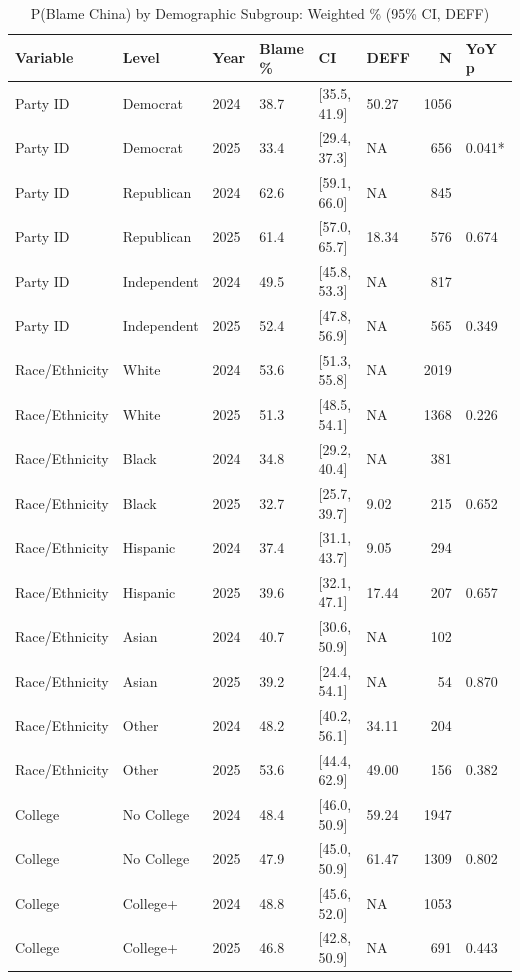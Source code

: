 \begin{table}[!h]
\centering
\caption{P(Blame China) by Demographic Subgroup: Weighted \% (95\% CI, DEFF)}
\centering
\begin{tabular}[t]{llllllrl}
\toprule
Variable & Level & Year & Blame \% & CI & DEFF & N & YoY p\\
\midrule
Party ID & Democrat & 2024 & 38.7 & {}[35.5, 41.9] & 50.27 & 1056 & \\
Party ID & Democrat & 2025 & 33.4 & {}[29.4, 37.3] & NA & 656 & 0.041*\\
Party ID & Republican & 2024 & 62.6 & {}[59.1, 66.0] & NA & 845 & \\
Party ID & Republican & 2025 & 61.4 & {}[57.0, 65.7] & 18.34 & 576 & 0.674\\
Party ID & Independent & 2024 & 49.5 & {}[45.8, 53.3] & NA & 817 & \\
Party ID & Independent & 2025 & 52.4 & {}[47.8, 56.9] & NA & 565 & 0.349\\
Race/Ethnicity & White & 2024 & 53.6 & {}[51.3, 55.8] & NA & 2019 & \\
Race/Ethnicity & White & 2025 & 51.3 & {}[48.5, 54.1] & NA & 1368 & 0.226\\
Race/Ethnicity & Black & 2024 & 34.8 & {}[29.2, 40.4] & NA & 381 & \\
Race/Ethnicity & Black & 2025 & 32.7 & {}[25.7, 39.7] & 9.02 & 215 & 0.652\\
Race/Ethnicity & Hispanic & 2024 & 37.4 & {}[31.1, 43.7] & 9.05 & 294 & \\
Race/Ethnicity & Hispanic & 2025 & 39.6 & {}[32.1, 47.1] & 17.44 & 207 & 0.657\\
Race/Ethnicity & Asian & 2024 & 40.7 & {}[30.6, 50.9] & NA & 102 & \\
Race/Ethnicity & Asian & 2025 & 39.2 & {}[24.4, 54.1] & NA & 54 & 0.870\\
Race/Ethnicity & Other & 2024 & 48.2 & {}[40.2, 56.1] & 34.11 & 204 & \\
Race/Ethnicity & Other & 2025 & 53.6 & {}[44.4, 62.9] & 49.00 & 156 & 0.382\\
College & No College & 2024 & 48.4 & {}[46.0, 50.9] & 59.24 & 1947 & \\
College & No College & 2025 & 47.9 & {}[45.0, 50.9] & 61.47 & 1309 & 0.802\\
College & College+ & 2024 & 48.8 & {}[45.6, 52.0] & NA & 1053 & \\
College & College+ & 2025 & 46.8 & {}[42.8, 50.9] & NA & 691 & 0.443\\

\end{tabular}
\end{table}
